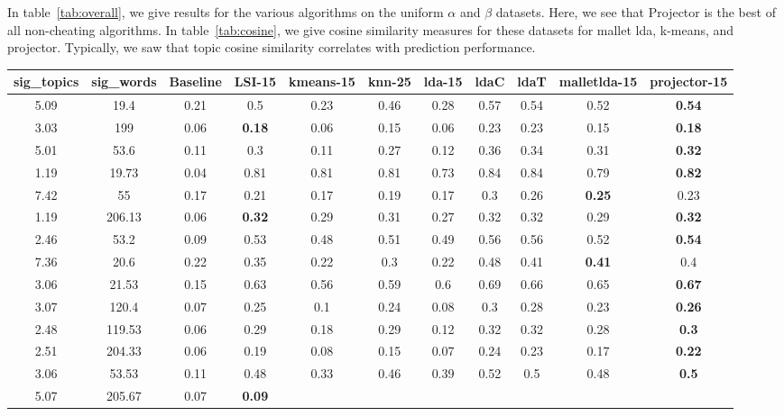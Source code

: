 In table~\ref{tab:overall}, we give results for the various algorithms
on the uniform $\alpha$ and $\beta$ datasets.  Here, we see that
Projector is the best of all non-cheating algorithms.  In
table~\ref{tab:cosine}, we give cosine similarity measures for these
datasets for mallet lda, k-means, and projector.  Typically, we saw
that topic cosine similarity correlates with prediction performance.

\begin{table}
{\small
\begin{tabular}{|c|c|c|c|c|c|c|c|c|c|c|}
\hline 
sig\_topics &sig\_words &Baseline &LSI-15 &kmeans-15 &knn-25 &lda-15 &ldaC &ldaT &malletlda-15 &projector-15 \\
 \hline 
5.09  &19.4  &0.21  &0.5  &0.23  &0.46  &0.28  &0.57  &0.54  &0.52  &\textbf{0.54}
  \\
 \hline 
3.03  &199  &0.06  &\textbf{0.18}
  &0.06  &0.15  &0.06  &0.23  &0.23  &0.15  &\textbf{0.18}
  \\
 \hline 
5.01  &53.6  &0.11  &0.3  &0.11  &0.27  &0.12  &0.36  &0.34  &0.31  &\textbf{0.32}
  \\
 \hline 
1.19  &19.73  &0.04  &0.81  &0.81  &0.81  &0.73  &0.84  &0.84  &0.79  &\textbf{0.82}
  \\
 \hline 
7.42  &55  &0.17  &0.21  &0.17  &0.19  &0.17  &0.3  &0.26  &\textbf{0.25}
  &0.23  \\
 \hline 
1.19  &206.13  &0.06  &\textbf{0.32}
  &0.29  &0.31  &0.27  &0.32  &0.32  &0.29  &\textbf{0.32}
  \\
 \hline 
2.46  &53.2  &0.09  &0.53  &0.48  &0.51  &0.49  &0.56  &0.56  &0.52  &\textbf{0.54}
  \\
 \hline 
7.36  &20.6  &0.22  &0.35  &0.22  &0.3  &0.22  &0.48  &0.41  &\textbf{0.41}
  &0.4  \\
 \hline 
3.06  &21.53  &0.15  &0.63  &0.56  &0.59  &0.6  &0.69  &0.66  &0.65  &\textbf{0.67}
  \\
 \hline 
3.07  &120.4  &0.07  &0.25  &0.1  &0.24  &0.08  &0.3  &0.28  &0.23  &\textbf{0.26}
  \\
 \hline 
2.48  &119.53  &0.06  &0.29  &0.18  &0.29  &0.12  &0.32  &0.32  &0.28  &\textbf{0.3}
  \\
 \hline 
2.51  &204.33  &0.06  &0.19  &0.08  &0.15  &0.07  &0.24  &0.23  &0.17  &\textbf{0.22}
  \\
 \hline 
3.06  &53.53  &0.11  &0.48  &0.33  &0.46  &0.39  &0.52  &0.5  &0.48  &\textbf{0.5}
  \\
 \hline 
5.07  &205.67  &0.07  &\textbf{0.09}

\end{tabular}}
\end{table}

